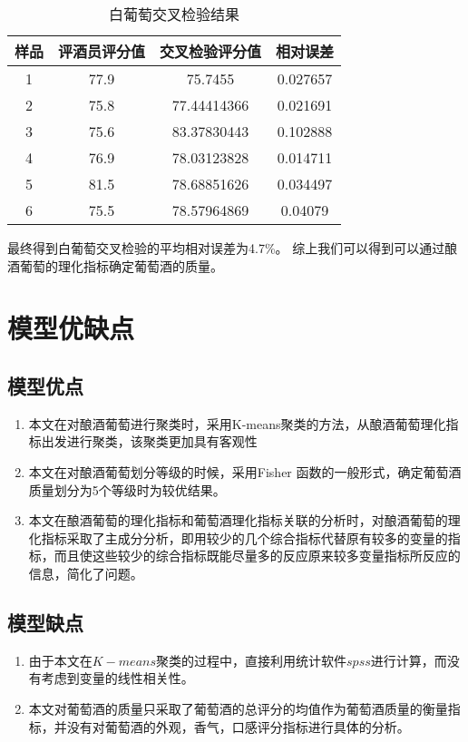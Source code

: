 \documentclass[withoutpreface,bwprint]{cumcmthesis} %
\begin{document}
\begin{table}[!htbp]
\centering
\caption{白葡萄交叉检验结果}
\label{白葡萄交叉检验结果}
\begin{tabular}{cccc}
\toprule
样品&评酒员评分值&交叉检验评分值&相对误差\\
\midrule
1&77.9&75.7455&0.027657\\
2&75.8&77.44414366&0.021691\\
3&75.6&83.37830443&0.102888\\
4&76.9&78.03123828&0.014711\\
5&81.5&78.68851626&0.034497\\
6&75.5&78.57964869&0.04079\\
\bottomrule 
\end{tabular}
\end{table}

最终得到白葡萄交叉检验的平均相对误差为4.7\%。
综上我们可以得到可以通过酿酒葡萄的理化指标确定葡萄酒的质量。

\newpage
\section{模型优缺点}
\subsection{模型优点}
\begin{enumerate}
	\item 本文在对酿酒葡萄进行聚类时，采用K-means聚类的方法，从酿酒葡萄理化指标出发进行聚类，该聚类更加具有客观性
	\item 本文在对酿酒葡萄划分等级的时候，采用Fisher 函数的一般形式，确定葡萄酒质量划分为5个等级时为较优结果。
	\item 本文在酿酒葡萄的理化指标和葡萄酒理化指标关联的分析时，对酿酒葡萄的理化指标采取了主成分分析，即用较少的几个综合指标代替原有较多的变量的指标，而且使这些较少的综合指标既能尽量多的反应原来较多变量指标所反应的信息，简化了问题。
\end{enumerate}

\subsection{模型缺点}
\begin{enumerate}
	\item 由于本文在$K-means$聚类的过程中，直接利用统计软件$spss$进行计算，而没有考虑到变量的线性相关性。
	\item 本文对葡萄酒的质量只采取了葡萄酒的总评分的均值作为葡萄酒质量的衡量指标，并没有对葡萄酒的外观，香气，口感评分指标进行具体的分析。
\end{enumerate}
\end{document}

